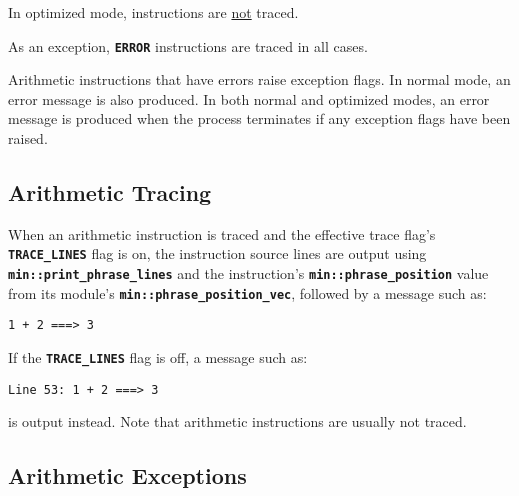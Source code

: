 \documentclass[12pt]{article}
\newcommand{\TT}[1]{{\tt \bfseries #1}}
\newcommand{\EOL}{\penalty \exhyphenpenalty}
\begin{document}
In optimized mode, instructions are \underline{not} traced.

As an exception, \TT{ERROR} instructions are traced in all cases.

Arithmetic instructions that have errors raise exception flags.
In normal mode, an error message is also produced.  In both
normal and optimized modes, an error message is produced
when the process terminates if any exception flags have been raised.

\subsection{Arithmetic Tracing}
\label{ARITHMETIC-TRACING}

When an arithmetic instruction is traced and the effective
trace flag's \TT{TRACE\_LINES} flag is on,
the instruction source lines are output
using \TT{min::\EOL print\_\EOL phrase\_\EOL lines} and the
instruction's \TT{min::\EOL phrase\_\EOL position} value from its module's
\TT{min::phrase\_\EOL position\_\EOL vec}, followed by
a message such as:
\begin{center}
\tt 1 + 2 ===> 3
\end{center}
If the \TT{TRACE\_LINES} flag is off, a message such as:
\begin{center}
\tt Line 53: 1 + 2 ===> 3
\end{center}
is output instead.
Note that arithmetic instructions are usually not traced.

\subsection{Arithmetic Exceptions}
\label{ARITHMETIC-EXCEPTIONS}
\end{document}
